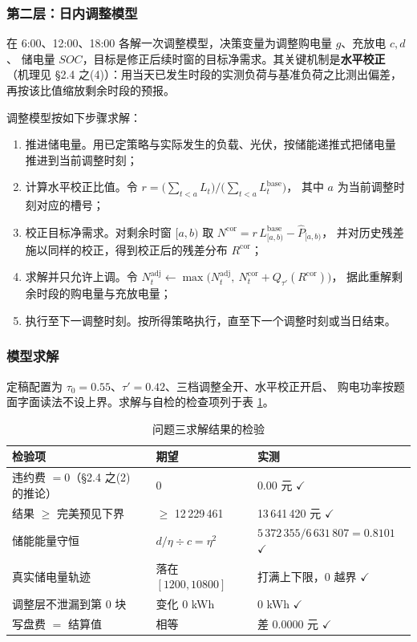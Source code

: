 \documentclass[withoutpreface]{cumcmthesis}
\renewcommand{\emph}[1]{\textbf{#1}}
\newcommand{\hd}[1]{\textbf{#1}}
\begin{document}
\subsubsection{第二层：日内调整模型}

在 6:00、12:00、18:00 各解一次调整模型，决策变量为调整购电量 $g$、充放电 $c,d$、
储电量 $SOC$，目标是修正后续时窗的目标净需求。其关键机制是\emph{水平校正}
（机理见 \S2.4 之(4)）：用当天已发生时段的实测负荷与基准负荷之比测出偏差，
再按该比值缩放剩余时段的预报。

调整模型按如下步骤求解：

\begin{enumerate}[label=Step \arabic*., leftmargin=*, itemsep=2pt, topsep=3pt]
  \item 推进储电量。用已定策略与实际发生的负载、光伏，按储能递推式把储电量
        推进到当前调整时刻；
  \item 计算水平校正比值。令
        $r=\bigl(\sum_{t<a}L_t\bigr)\big/\bigl(\sum_{t<a}L^{\text{base}}_t\bigr)$，
        其中 $a$ 为当前调整时刻对应的槽号；
  \item 校正目标净需求。对剩余时窗 $[a,b)$ 取
        $N^{\text{cor}}=r\,L^{\text{base}}_{[a,b)}-\hat P_{[a,b)}$，
        并对历史残差施以同样的校正，得到校正后的残差分布 $R^{\text{cor}}$；
  \item 求解并只允许上调。令
        $N_t^{\text{adj}}\leftarrow\max\bigl(N_t^{\text{adj}},\
        N_t^{\text{cor}}+Q_{\tau'}(R^{\text{cor}})\bigr)$，
        据此重解剩余时段的购电量与充放电量；
  \item 执行至下一调整时刻。按所得策略执行，直至下一个调整时刻或当日结束。
\end{enumerate}

\subsubsection{模型求解}
\label{sec:q3result}

定稿配置为 $\tau_0=0.55$、$\tau'=0.42$、三档调整全开、水平校正开启、
购电功率按题面字面读法不设上界。求解与自检的检查项列于表 \ref{tab:q3check}。

\begin{table}[!htbp]
  \centering
  \caption{问题三求解结果的检验}\label{tab:q3check}
  \begin{tabular}{l l l}
    \toprule[1.5pt]
    \hd{检验项} & \hd{期望} & \hd{实测}\\
    \midrule[1pt]
    违约费 $=0$（\S2.4 之(2) 的推论） & 0 & 0.00 元 $\checkmark$\\
    结果 $\ge$ 完美预见下界 & $\ge$ 12\,229\,461 & 13\,641\,420 元 $\checkmark$\\
    储能能量守恒 & $d/\eta\div c=\eta^2$ & $5\,372\,355/6\,631\,807=0.8101$ $\checkmark$\\
    真实储电量轨迹 & 落在 $[1200,10800]$ & 打满上下限，0 越界 $\checkmark$\\
    调整层不泄漏到第 0 块 & 变化 0 kWh & 0 kWh $\checkmark$\\
    写盘费 $=$ 结算值 & 相等 & 差 0.0000 元 $\checkmark$\\
    \bottomrule[1.5pt]
  \end{tabular}
\end{table}
\end{document}
